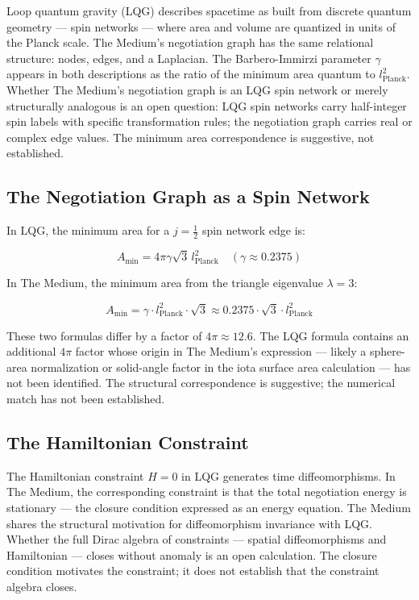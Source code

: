 \documentclass[11pt,letterpaper]{article}
\newenvironment{plainbox}{\begin{tcolorbox}[colback=blue!3!white,colframe=blue!40!white,title={\small\textit{In plain language}},breakable]}{\end{tcolorbox}}
\begin{document}
\begin{plainbox}
Loop quantum gravity (LQG) describes spacetime as built from discrete quantum geometry --- spin networks --- where area and volume are quantized in units of the Planck scale. The Medium's negotiation graph has the same relational structure: nodes, edges, and a Laplacian. The Barbero-Immirzi parameter \(\gamma\) appears in both descriptions as the ratio of the minimum area quantum to \(l_\text{Planck}^2\). Whether The Medium's negotiation graph is an LQG spin network or merely structurally analogous is an open question: LQG spin networks carry half-integer spin labels with specific transformation rules; the negotiation graph carries real or complex edge values. The minimum area correspondence is suggestive, not established.
\end{plainbox}

\subsection{The Negotiation Graph as a Spin Network}
\label{sec:orga4e0f71}

In LQG, the minimum area for a \(j = \tfrac{1}{2}\) spin network edge is:

\begin{equation}
A_\text{min} = 4\pi\gamma\sqrt{3}\, l_\text{Planck}^2 \quad (\gamma \approx 0.2375)
\end{equation}

In The Medium, the minimum area from the triangle eigenvalue \(\lambda = 3\):

\begin{equation}
A_\text{min} = \gamma \cdot l_\text{Planck}^2 \cdot \sqrt{3} \approx 0.2375 \cdot \sqrt{3} \cdot l_\text{Planck}^2
\end{equation}

These two formulas differ by a factor of \(4\pi \approx 12.6\). The LQG formula contains an additional \(4\pi\) factor whose origin in The Medium's expression --- likely a sphere-area normalization or solid-angle factor in the iota surface area calculation --- has not been identified. The structural correspondence is suggestive; the numerical match has not been established.

\subsection{The Hamiltonian Constraint}
\label{sec:orge627f66}

The Hamiltonian constraint \(H = 0\) in LQG generates time diffeomorphisms. In The Medium, the corresponding constraint is that the total negotiation energy is stationary --- the closure condition expressed as an energy equation. The Medium shares the structural motivation for diffeomorphism invariance with LQG. Whether the full Dirac algebra of constraints --- spatial diffeomorphisms and Hamiltonian --- closes without anomaly is an open calculation. The closure condition motivates the constraint; it does not establish that the constraint algebra closes.
\end{document}

